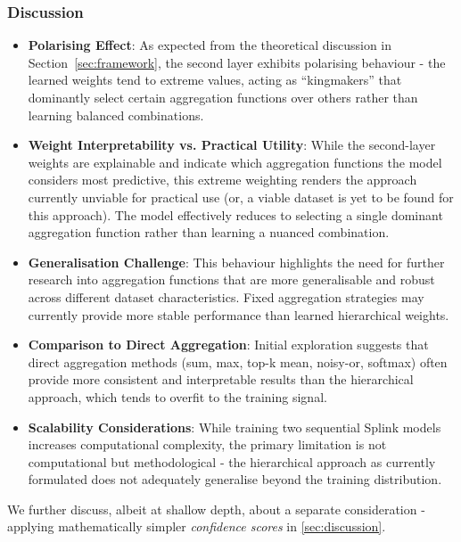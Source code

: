 \subsubsection{Discussion}
\begin{itemize}
    \item \textbf{Polarising Effect}: As expected from the theoretical discussion in Section~\ref{sec:framework}, the second layer exhibits polarising behaviour - the learned weights tend to extreme values, acting as ``kingmakers'' that dominantly select certain aggregation functions over others rather than learning balanced combinations.
    \item \textbf{Weight Interpretability vs. Practical Utility}: While the second-layer weights are explainable and indicate which aggregation functions the model considers most predictive, this extreme weighting renders the approach currently unviable for practical use (or, a viable dataset is yet to be found for this approach). The model effectively reduces to selecting a single dominant aggregation function rather than learning a nuanced combination.
    \item \textbf{Generalisation Challenge}: This behaviour highlights the need for further research into aggregation functions that are more generalisable and robust across different dataset characteristics. Fixed aggregation strategies may currently provide more stable performance than learned hierarchical weights.
    \item \textbf{Comparison to Direct Aggregation}: Initial exploration suggests that direct aggregation methods (sum, max, top-k mean, noisy-or, softmax) often provide more consistent and interpretable results than the hierarchical approach, which tends to overfit to the training signal.
    \item \textbf{Scalability Considerations}: While training two sequential Splink models increases computational complexity, the primary limitation is not computational but methodological - the hierarchical approach as currently formulated does not adequately generalise beyond the training distribution.
\end{itemize}

We further discuss, albeit at shallow depth, about a separate consideration - applying mathematically simpler \textit{confidence scores} in \ref{sec:discussion}. 

